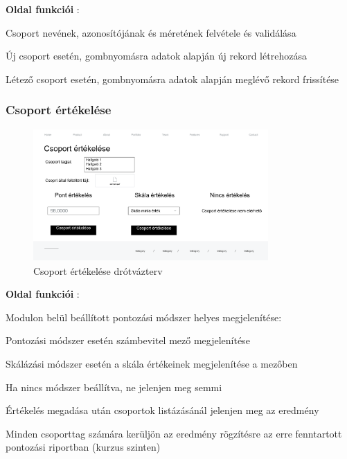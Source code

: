 \textbf{Oldal funkciói} :

\begin{compactitem}
	\item  Csoport nevének, azonosítójának és méretének felvétele és validálása
        \item Új csoport esetén, gombnyomásra adatok alapján új rekord létrehozása
        \item Létező csoport esetén, gombnyomásra adatok alapján meglévő rekord frissítése
 \end{compactitem}

\subsubsection{Csoport értékelése}

\begin{figure}[H]
	\centering
	\includegraphics[width=0.8\textwidth]{images/csoport_ertekelese_wire.png}
	\caption{Csoport értékelése drótvázterv}
\end{figure}

\textbf{Oldal funkciói} :

\begin{compactitem}
	\item Modulon belül beállított pontozási módszer helyes megjelenítése:
            \begin{compactitem}
                \item Pontozási módszer esetén számbevitel mező megjelenítése
                \item Skálázási módszer esetén a skála értékeinek megjelenítése a mezőben
                \item Ha nincs módszer beállítva, ne jelenjen meg semmi
            \end{compactitem}
        \item Értékelés megadása után csoportok listázásánál jelenjen meg az eredmény
        \item Minden csoporttag számára kerüljön az eredmény rögzítésre az erre fenntartott pontozási riportban (kurzus szinten)
 \end{compactitem}

